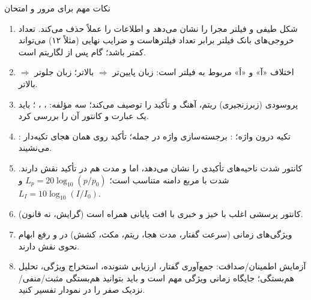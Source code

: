 \begin{exambox}{نکات مهم برای مرور و امتحان}
\begin{enumerate}
  \item {} شکل طیفی و فیلتر مجرا را نشان می‌دهد و اطلاعات  را عملاً حذف می‌کند. تعداد خروجی‌های بانک فیلتر برابر تعداد فیلترهاست و ضرایب نهایی (مثلاً ۱۲) می‌تواند کمتر باشد؛ گام پس از لگاریتم  است.
  \item اختلاف «آ» و «اَ» مربوط به فیلتر است: زبان پایین‌تر $\Rightarrow$  بالاتر؛ زبان جلوتر $\Rightarrow$  بالاتر.
  \item پروسودی (زبرزنجیری) ریتم، آهنگ و تأکید را توصیف می‌کند؛ سه مؤلفه: ، ، ؛ باید یک عبارت و کانتور آن را بررسی کرد.
  \item {}: تکیه درون واژه؛ : برجسته‌سازی واژه در جمله؛ تأکید روی همان هجای تکیه‌دار می‌نشیند.
  \item کانتور شدت ناحیه‌های تأکیدی را نشان می‌دهد، اما  و مدت هم در تأکید نقش دارند. شدت با مربع دامنه متناسب است؛ $L_p=20\log_{10}(p/p_0)$ و $L_I=10\log_{10}(I/I_0)$.
  \item کانتور پرسشی اغلب با خیز و خبری با افت پایانی همراه است (گرایش، نه قانون).
  \item ویژگی‌های زمانی (سرعت گفتار، مدت هجا، ریتم، مکث، کشش) در  و رفع ابهام نحوی نقش دارند.
  \item آزمایش اطمینان/صداقت: جمع‌آوری گفتار، ارزیابی شنونده، استخراج ویژگی، تحلیل هم‌بستگی؛ جایگاه زمانی ویژگی مهم است و باید بتوانید هم‌بستگی مثبت/منفی/نزدیک صفر را در نمودار تفسیر کنید.
\end{enumerate}
\end{exambox}
